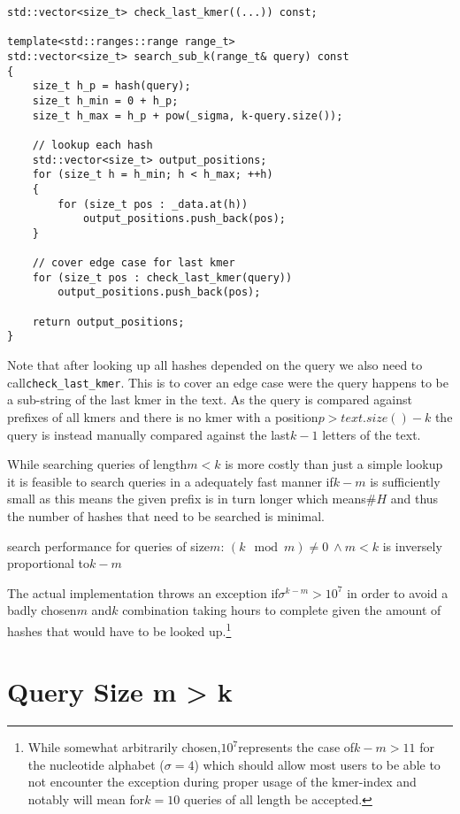 \begin{lstlisting}[caption={Search function for queries of size 0 < m < k},language={[GNU]C++},tabsize=2]
std::vector<size_t> check_last_kmer((...)) const;

template<std::ranges::range range_t>
std::vector<size_t> search_sub_k(range_t& query) const
{
	size_t h_p = hash(query);
	size_t h_min = 0 + h_p;
	size_t h_max = h_p + pow(_sigma, k-query.size());

	// lookup each hash
	std::vector<size_t> output_positions;
	for (size_t h = h_min; h < h_max; ++h)
	{
		for (size_t pos : _data.at(h))
			output_positions.push_back(pos);
	}

	// cover edge case for last kmer
	for (size_t pos : check_last_kmer(query))
		output_positions.push_back(pos);

	return output_positions;
}
\end{lstlisting}

Note that after looking up all hashes depended on the query we also
need to call\lstinline{check_last_kmer}. This is to cover an edge
case were the query happens to be a sub-string of the last kmer in
the text. As the query is compared against prefixes of all kmers and
there is no kmer with a position$p>text.size()-k$ the query is instead
manually compared against the last$k-1$ letters of the text.

While searching queries of length$m<k$ is more costly than just a
simple lookup it is feasible to search queries in a adequately fast
manner if$k-m$ is sufficiently small as this means the given prefix
is in turn longer which means$\#H$ and thus the number of hashes
that need to be searched is minimal.
\begin{lem}
\label{Lemma 2}search performance for queries of size$m:\,(k\mod m)\neq0\:\land m<k$
is inversely proportional to$k-m$
\end{lem}
The actual implementation throws an exception if$\sigma^{k-m}>10^{7}$
in order to avoid a badly chosen$m$ and$k$ combination taking hours
to complete given the amount of hashes that would have to be looked
up.\footnote{While somewhat arbitrarily chosen,$10^{7}$represents the case of$k-m>11$
for the nucleotide alphabet ($\sigma=4$) which should allow most
users to be able to not encounter the exception during proper usage
of the kmer-index and notably will mean for$k=10$ queries of all
length be accepted.}

\section{\label{section 3.3}Query Size m > k}

